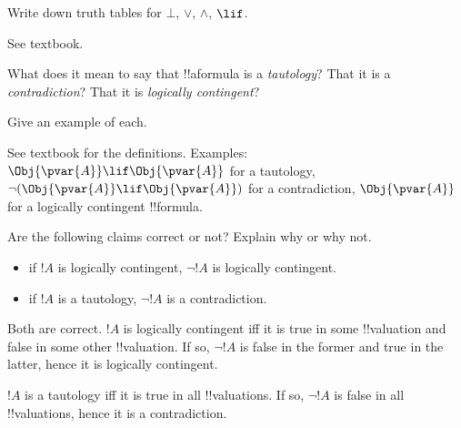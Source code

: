 \documentclass[../../../include/open-logic-section]{subfiles}
\begin{document}


\begin{prob}
    Write down truth tables for $\bot$, $\lor$, $\land$, $\lif$.

    \begin{ans}See textbook.\end{ans}
\end{prob}

\begin{prob}
    What does it mean to say that !!a{formula} is a \emph{tautology}?
    That it is a \emph{contradiction}? That it is \emph{logically contingent}?

    Give an example of each.
    \begin{ans}See textbook for the definitions. Examples: 
        $\Obj{\pvar{A}}\lif\Obj{\pvar{A}}$ for a tautology, 
        $\lnot(\Obj{\pvar{A}}\lif\Obj{\pvar{A}})$ for a contradiction, 
        $\Obj{\pvar{A}}$ for a logically contingent !!{formula}. 
    \end{ans}
\end{prob}

\begin{prob}
    Are the following claims correct or not? Explain why or why not.
    \begin{itemize}
    \item if $!A$ is logically contingent, $\lnot !A$ is logically contingent.
    \item if $!A$ is a tautology, $\lnot !A$ is a contradiction.
    \end{itemize}

    \begin{ans}
    Both are correct. $!A$ is logically contingent iff it is true in some
    !!{valuation} and false in some other !!{valuation}. If so, $\lnot!A$ is
    false in the former and true in the latter, hence it is logically
    contingent.

    $!A$ is a tautology iff it is true in all !!{valuation}s. If so, 
    $\lnot !A$ is false in all !!{valuation}s, hence it is a contradiction.
    \end{ans}
\end{prob}
\end{document}
